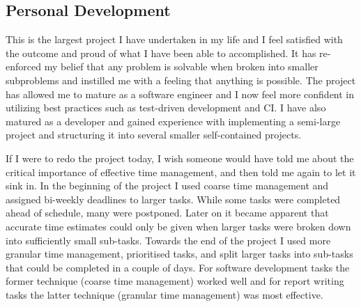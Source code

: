 
\subsection{Personal Development}

This is the largest project I have undertaken in my life and I feel satisfied with the outcome and proud of what I have been able to accomplished. It has re-enforced my belief that any problem is solvable when broken into smaller subproblems and instilled me with a feeling that anything is possible. The project has allowed me to mature as a software engineer and I now feel more confident in utilizing best practices such as test-driven development and CI. I have also matured as a developer and gained experience with implementing a semi-large project and structuring it into several smaller self-contained projects.

If I were to redo the project today, I wish someone would have told me about the critical importance of effective time management, and then told me again to let it sink in. In the beginning of the project I used coarse time management and assigned bi-weekly deadlines to larger tasks. While some tasks were completed ahead of schedule, many were postponed. Later on it became apparent that accurate time estimates could only be given when larger tasks were broken down into sufficiently small sub-tasks. Towards the end of the project I used more granular time management, prioritised tasks, and split larger tasks into sub-tasks that could be completed in a couple of days. For software development tasks the former technique (coarse time management) worked well and for report writing tasks the latter technique (granular time management) was most effective.
